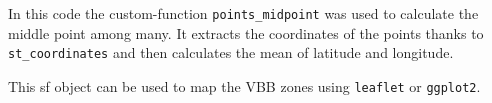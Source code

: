

In this code the custom-function \texttt{points\_midpoint} was used to calculate the middle point among many. It extracts the coordinates of the points thanks to \texttt{st\_coordinates} and then calculates the mean of latitude and longitude.



This sf object can be used to map the VBB zones using \texttt{leaflet} or \texttt{ggplot2}.

